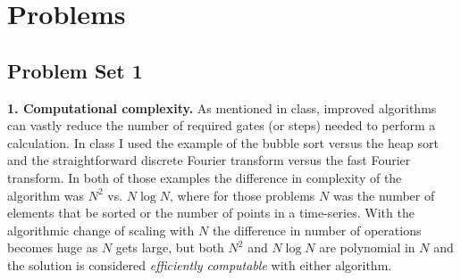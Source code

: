 \documentclass{book}
\theoremstyle{definition}
\begin{document}
\chapter{Problems}

\newpage

\section{Problem Set 1}



\noindent \textbf{1. Computational complexity.}  As mentioned in class, improved algorithms can vastly reduce
the number of required gates (or steps) needed to perform a calculation. In class I used the
example of the bubble sort versus the heap sort and the straightforward discrete Fourier
transform versus the fast Fourier transform. In both of those examples the difference in
complexity of the algorithm was $N^2$ vs. $N \log N$, where for those problems $N$ was the number
of elements that be sorted or the number of points in a time-series. With the algorithmic
change of scaling with $N$ the difference in number of operations becomes huge as $N$ gets
large, but both $N^2$ and $N \log N$ are polynomial in $N$ and the solution is considered \textit{efficiently
computable} with either algorithm.
\\
\end{document}

